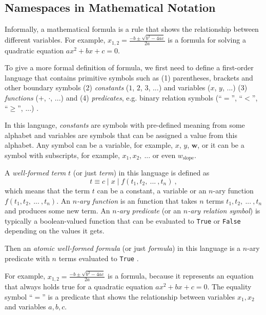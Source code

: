

\subsection{Namespaces in Mathematical Notation}

Informally, a mathematical formula is a rule that shows the relationship
between different variables. For example,
$x_{1,2} = \frac{-b \pm \sqrt{b^2 - 4 a c}}{2 a}$ is a formula for solving
a quadratic equation $a x^2 + b x + c = 0$.


To give a more formal definition of formula, we first need to define
a first-order language that contains primitive symbols such as
(1) parentheses, brackets and other boundary symbols
(2) \emph{constants} ($1$, $2$, $3$, ...) and variables ($x$, $y$, ...)
(3) \emph{functions} ($+$, $\cdot$, ...) and
(4) \emph{predicates}, e.g. binary relation symbols (``$=$'', ``$<$'', ``$\geqslant$'', ...)
\cite{barwise2000language}.

In this language, \emph{constants} are symbols with pre-defined meaning
from some alphabet and variables are symbols that can be assigned
a value from this alphabet.
Any symbol can be a variable, for example, $x$, $y$, $\mathbf w$, or it can
be a symbol with subscripts, for example, $x_1, x_2, \ ...$ or even $w_\text{slope}$.

A \emph{well-formed term} $t$ (or just \emph{term}) in this language is defined as
$$t \equiv c \mid x \mid f(t_1, t_2, \ ... \ , t_n) \ ,$$ which means that the term
$t$ can be a constant, a variable or an $n$-ary function
$f(t_1, t_2, \ ... \ , t_n)$. An  \emph{$n$-ary function} is an
function that takes $n$ terms $t_1, t_2, \ ... \ , t_n$ and produces
some new term. An \emph{$n$-ary predicate} (or an \emph{$n$-ary relation symbol})
is typically a boolean-valued function that can be evaluated to \texttt{True}
or \texttt{False} depending on the values it gets.

Then an \emph{atomic well-formed formula} (or just \emph{formula}) in this language
is a $n$-ary predicate with $n$ terms evaluated to \texttt{True} \cite{barwise2000language}.

For example, $x_{1,2} = \frac{-b \pm \sqrt{b^2 - 4 a c}}{2 a}$ is a formula,
because it represents an equation that always holds true for a quadratic equation
$a x^2 + b x + c = 0$. The equality symbol ``$=$'' is a predicate that shows
the relationship between variables $x_1, x_2$ and variables $a, b, c$.

